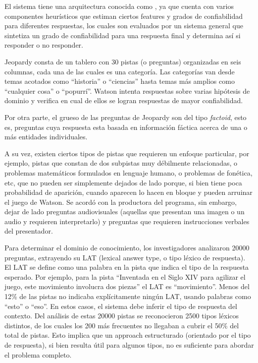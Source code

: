 \bigskip

El sistema tiene una arquitectura conocida como , ya que cuenta con varios componentes heurísticos que estiman
ciertos features y grados de confiabilidad para diferentes respuestas, los cuales son evaluados por un sistema general que sintetiza un grado
de confiabilidad para una respuesta final y determina así si responder o no responder.

Jeopardy consta de un tablero con 30 pistas (o preguntas) organizadas
en seis columnas, cada una de las cuales es una categoría. Las
categorías van desde temas acotados como
{\textquotedblleft}historia{\textquotedblright} o
{\textquotedblleft}ciencias{\textquotedblright} hasta temas más
amplios como {\textquotedblleft}cualquier cosa{\textquotedblright} o
{\textquotedblleft}popurrí{\textquotedblright}. Watson intenta
respuestas sobre varias hipótesis de dominio y verifica en cual de
ellos se logran respuestas de mayor confiabilidad.

Por otra parte, el grueso de las preguntas de Jeopardy son del tipo
\textit{factoid}, esto es, preguntas cuya respuesta esta basada en
información fáctica acerca de una o más entidades individuales.

A su vez, existen ciertos tipos de pistas que requieren un enfoque
particular, por ejemplo, pistas que constan de dos subpistas muy
débilmente relacionadas, o problemas matemáticos formulados en
lenguaje humano, o problemas de fonética, etc, que no pueden ser
simplemente dejados de lado porque, si bien tiene poca probabilidad de
aparición, cuando aparecen lo hacen en bloque y pueden arruinar el
juego de Watson. Se acordó con la productora del programa, sin
embargo, dejar de lado preguntas audiovisuales (aquellas que presentan
una imagen o un audio y requieren interpretarlo) y preguntas que
requieren instrucciones verbales del presentador.


\bigskip

Para determinar el dominio de conocimiento, los investigadores analizaron 20000 preguntas, extrayendo su LAT (lexical answer type, o tipo léxico de respuesta). El LAT se define como una palabra en la
pista que indica el tipo de la respuesta esperado. Por ejemplo, para la pista {\textquotedblleft}Inventada en el Siglo XIV para agilizar el juego, este movimiento involucra dos piezas{\textquotedblright} el LAT es {\textquotedblleft}movimiento{\textquotedblright}. Menos del 12\% de las pistas no indicaba explícitamente ningún LAT, usando palabras
como {\textquotedblleft}esto{\textquotedblright} o {\textquotedblleft}eso{\textquotedblright}. En estos casos, el sistema debe inferir el tipo de respuesta del contexto. Del análisis de estas
20000 pistas se reconocieron 2500 tipos léxicos distintos, de los cuales los 200 más frecuentes no llegaban a cubrir el 50\% del total de pistas. Esto implica que un approach estructurado (orientado por el
tipo de respuesta), si bien resulta útil para algunos tipos, no es suficiente para abordar el problema completo.

